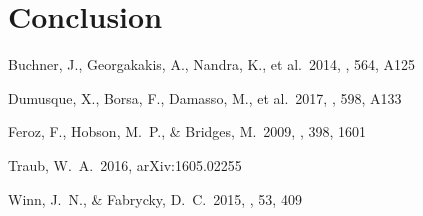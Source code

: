 \documentclass[12pt,manuscript]{aastex}
\begin{document}
\section{Conclusion}
\label{section: conclusion}

\begin{thebibliography}{}

 Buchner, J., Georgakakis, A., Nandra, K., et al.\ 2014, \aap, 564, A125

 Dumusque, X., Borsa, F., Damasso, M., et al.\ 2017, \aap, 598, A133 

 Feroz, F., Hobson, M.~P., \& Bridges, M.\ 2009, \mnras, 398, 1601 

 Traub, W.~A.\ 2016, arXiv:1605.02255 

 Winn, J.~N., \& Fabrycky, D.~C.\ 2015, \araa, 53, 409 

\end{thebibliography}

 
\end{document}
